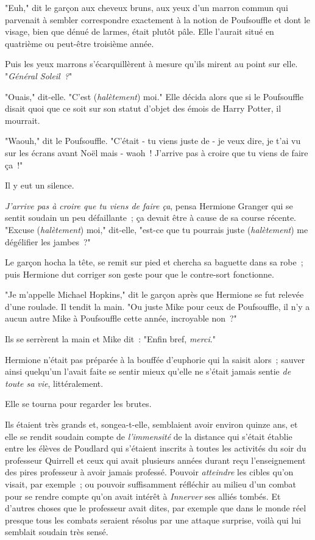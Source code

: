 "Euh," dit le garçon aux cheveux bruns, aux yeux d'un marron commun qui parvenait à sembler correspondre exactement à la notion de Poufsouffle et dont le visage, bien que dénué de larmes, était plutôt pâle. Elle l'aurait situé en quatrième ou peut-être troisième année.

Puis les yeux marrons s'écarquillèrent à mesure qu'ils mirent au point sur elle. "\emph{Général Soleil~?}"

"Ouais," dit-elle. "C'est (\emph{halètement}) moi." Elle décida alors que si le Poufsouffle disait quoi que ce soit sur son statut d'objet des émois de Harry Potter, il mourrait.

"Waouh," dit le Poufsouffle. "C'était - tu viens juste de - je veux dire, je t'ai vu sur les écrans avant Noël mais - waoh~! J'arrive pas à croire que tu viens de faire ça~!"

Il y eut un silence.

\emph{J'arrive pas à croire que tu viens de faire ça}, pensa Hermione Granger qui se sentit soudain un peu défaillante~; ça devait être à cause de sa course récente. "Excuse (\emph{halètement}) moi," dit-elle, "est-ce que tu pourrais juste (\emph{halètement}) me dégélifier les jambes~?"

Le garçon hocha la tête, se remit sur pied et chercha sa baguette dans sa robe~; puis Hermione dut corriger son geste pour que le contre-sort fonctionne.

"Je m'appelle Michael Hopkins," dit le garçon après que Hermione se fut relevée d'une roulade. Il tendit la main. "Ou juste Mike pour ceux de Poufsouffle, il n'y a aucun autre Mike à Poufsouffle cette année, incroyable non~?"

Ils se serrèrent la main et Mike dit~: "Enfin bref, \emph{merci}."

Hermione n'était pas préparée à la bouffée d'euphorie qui la saisit alors~; sauver ainsi quelqu'un l'avait faite se sentir mieux qu'elle ne s'était jamais sentie \emph{de toute sa vie}, littéralement.

Elle se tourna pour regarder les brutes.

Ils étaient très grands et, songea-t-elle, semblaient avoir environ quinze ans, et elle se rendit soudain compte de \emph{l'immensité} de la distance qui s'était établie entre les élèves de Poudlard qui s'étaient inscrits à toutes les activités du soir du professeur Quirrell et ceux qui avait plusieurs années durant reçu l'enseignement des pires professeur à avoir jamais professé. Pouvoir \emph{atteindre} les cibles qu'on visait, par exemple~; ou pouvoir suffisamment réfléchir au milieu d'un combat pour se rendre compte qu'on avait intérêt à \emph{Innerver} ses alliés tombés. Et d'autres choses que le professeur avait dites, par exemple que dans le monde réel presque tous les combats seraient résolus par une attaque surprise, voilà qui lui semblait soudain très sensé.

